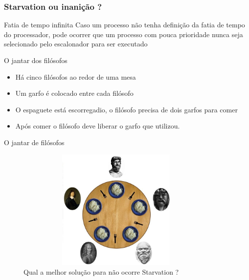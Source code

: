 \documentclass[11pt]{beamer}
\begin{document}
\begin{frame}\frametitle{ Starvation ou inanição ?}

\begin{block}{ Fatia de tempo infinita}
 Caso um processo não tenha definição da fatia de tempo do processador, pode ocorrer que um processo com pouca prioridade nunca seja selecionado 
 pelo escalonador para ser executado
\end{block}

\pause
\begin{exampleblock}{ O jantar dos filósofos}
  \begin{itemize}
   \item Há cinco filósofos ao redor de uma mesa
   \pause
   \item Um garfo é colocado entre cada filósofo
   \pause
   \item O espaguete está escorregadio, o filósofo precisa de dois garfos para comer
   \pause
   \item Após comer o filósofo deve liberar o garfo que utilizou.
  \end{itemize}

\end{exampleblock}

\end{frame}

\begin{frame}{ O jantar de filósofos}
\begin{figure}[h]

\includegraphics[width=100mm, height=60mm]{Figuras/filosofos.jpg}\\
\pause
Qual a melhor solução para não ocorre Starvation ?

\end{figure}


\end{frame}
\end{document}
